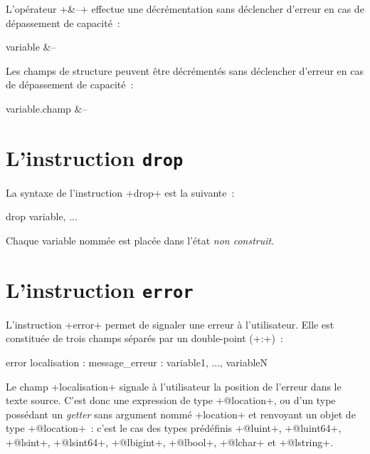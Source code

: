 L'opérateur \ggs+&--+ effectue une décrémentation sans déclencher d'erreur en cas de dépassement de capacité~:
\begin{galgasbox}
variable &--
\end{galgasbox}

Les champs de structure peuvent être décrémentés sans déclencher d'erreur en cas de dépassement de capacité~:
\begin{galgasbox}
variable.champ &--
\end{galgasbox}




\section{L'instruction \texttt{drop}}

La syntaxe de l'instruction \ggs+drop+ est la suivante~:

\begin{galgasbox}
drop variable, ...
\end{galgasbox}

Chaque variable nommée est placée dans l'état \emph{non construit}.








\section{L'instruction \texttt{error}}

L'instruction \ggs+error+ permet de signaler une erreur à l'utilisateur. Elle est constituée de trois champs séparés par un double-point (\ggs+:+)~:

\begin{galgasbox}
error localisation : message_erreur : variable1, ..., variableN
\end{galgasbox}



Le champ \ggs+localisation+ signale à l'utilisateur la position de l'erreur dans le texte source. C'est donc une expression de type \ggs+@location+, ou d'un type possédant un \emph{getter} sans argument nommé \ggs+location+ et renvoyant un objet de type \ggs+@location+~: c'est le cas des types prédéfinis \ggs+@luint+, \ggs+@luint64+, \ggs+@lsint+, \ggs+@lsint64+, \ggs+@lbigint+, \ggs+@lbool+, \ggs+@lchar+ et \ggs+@lstring+.

